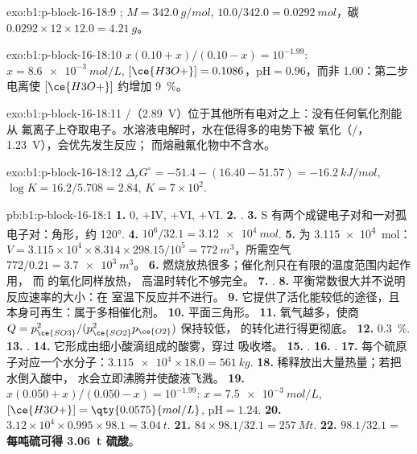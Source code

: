 \begin{solution}{exo:b1:p-block-16-18:9}
; $M = \qty{342.0}{g/mol}$, $10.0/342.0 =
\qty{0.0292}{mol}$，碳 $0.0292 \times 12 \times 12.0 = \qty{4.21}{g}$。
\end{solution}

\begin{solution}{exo:b1:p-block-16-18:10}
$x(0.10 + x)/(0.10 - x) = 10^{-1.99}$: $x = \qty{8.6e-3}{mol/L}$,
$[\ce{H3O+}] = 0.1086$，$\mathrm{pH} = 0.96$，而非 1.00：第二步
电离使 $[\ce{H3O+}]$ 约增加 \qty{9}{\percent}。
\end{solution}

\begin{solution}{exo:b1:p-block-16-18:11}
/（2.89~V）位于其他所有电对之上：没有任何氧化剂能从
氟离子上夺取电子。水溶液电解时，水在低得多的电势下被
氧化（/，1.23~V），会优先发生反应；
而熔融氟化物中不含水。
\end{solution}

\begin{solution}{exo:b1:p-block-16-18:12}
$\Delta_r G^\circ = -51.4 - (16.40 - 51.57) = \qty{-16.2}{kJ/mol}$,
$\log K = 16.2/5.708 = 2.84$, $K = 7 \times 10^2$.
\end{solution}

\begin{solution}{pb:b1:p-block-16-18:1}
\textbf{1.} 0, $+$IV, $+$VI, $+$VI.
\textbf{2.} .
\textbf{3.} S 有两个成键电子对和一对孤电子对：角形，约
\ang{120}.
\textbf{4.} $10^6/32.1 = \qty{3.12e4}{mol}$.
\textbf{5.}  为 \qty{3.115e4}{mol}：$V = 3.115 \times 10^4 \times
8.314 \times 298.15/10^5 = \qty{772}{m^3}$，所需空气 $772/0.21 = \qty{3.7e3}{m^3}$。
\textbf{6.} 燃烧放热很多；催化剂只在有限的温度范围内起作用，
而  的氧化同样放热，
高温时转化不够完全。
\textbf{7.} .
\textbf{8.} 平衡常数很大并不说明反应速率的大小：在
室温下反应并不进行。
\textbf{9.} 它提供了活化能较低的途径，且
本身可再生：属于多相催化剂。
\textbf{10.} 平面三角形。
\textbf{11.} 氧气越多，使商
$Q = p_{\ce{SO3}}^2/(p_{\ce{SO2}}^2 p_{\ce{O2}})$ 保持较低，
 的转化进行得更彻底。
\textbf{12.} \qty{0.3}{\percent}.
\textbf{13.} .
\textbf{14.} 它形成由细小酸滴组成的酸雾，穿过
吸收塔。
\textbf{15.} .
\textbf{16.} .
\textbf{17.} 每个硫原子对应一个水分子：$\num{3.115e4} \times 18.0 =
\qty{561}{kg}$.
\textbf{18.} 稀释放出大量热量；若把水倒入酸中，
水会立即沸腾并使酸液飞溅。
\textbf{19.} $x(0.050 + x)/(0.050 - x) = 10^{-1.99}$: $x = \qty{7.5e-3}{mol/L}$,
$[\ce{H3O+}] = \qty{0.0575}{mol/L}$, $\mathrm{pH} = 1.24$.
\textbf{20.} $3.12 \times 10^4 \times 0.995 \times 98.1 = \qty{3.04}{t}$.
\textbf{21.} $84 \times 98.1/32.1 = \qty{257}{Mt}$.
\textbf{22.} $98.1/32.1 =$ \textbf{每吨硫可得 \qty{3.06}{t}
硫酸}。
\end{solution}
